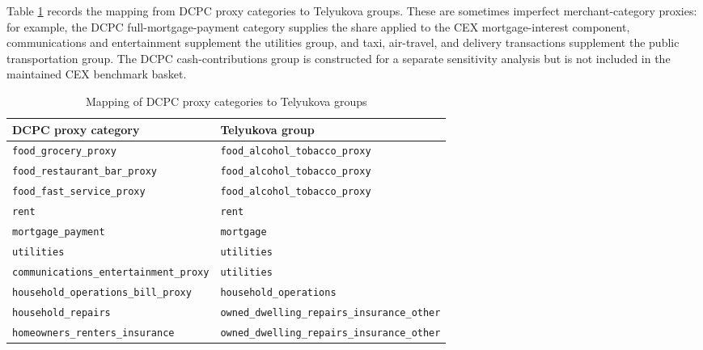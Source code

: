 \documentclass[11pt]{article}
\newcommand{\code}[1]{\nolinkurl{#1}}
\begin{document}
Table \ref{tab:dcpc-telyukova-crosswalk} records the mapping from DCPC proxy categories to Telyukova groups. These are sometimes imperfect merchant-category proxies: for example, the DCPC full-mortgage-payment category supplies the share applied to the CEX mortgage-interest component, communications and entertainment supplement the utilities group, and taxi, air-travel, and delivery transactions supplement the public transportation group. The DCPC cash-contributions group is constructed for a separate sensitivity analysis but is not included in the maintained CEX benchmark basket.

\begin{table}[htbp]
	\centering
	\small
	\setlength{\tabcolsep}{8pt}
	\renewcommand{\arraystretch}{1.2}
	
	\caption{Mapping of DCPC proxy categories to Telyukova groups}
	\label{tab:dcpc-telyukova-crosswalk}
	
	\begin{tabular}{
			>{\RaggedRight\arraybackslash}p{}
			>{\RaggedRight\arraybackslash}p{}
		}
		\toprule
		DCPC proxy category & Telyukova group \\
		\midrule
		
		\code{food_grocery_proxy}
		& \code{food_alcohol_tobacco_proxy} \\
		
		\code{food_restaurant_bar_proxy}
		& \code{food_alcohol_tobacco_proxy} \\
		
		\code{food_fast_service_proxy}
		& \code{food_alcohol_tobacco_proxy} \\
		
		\code{rent}
		& \code{rent} \\
		
		\code{mortgage_payment}
		& \code{mortgage} \\
		
		\code{utilities}
		& \code{utilities} \\
		
		\code{communications_entertainment_proxy}
		& \code{utilities} \\
		
		\code{household_operations_bill_proxy}
		& \code{household_operations} \\
		
		\code{household_repairs}
		& \code{owned_dwelling_repairs_insurance_other} \\
		
		\code{homeowners_renters_insurance}
		& \code{owned_dwelling_repairs_insurance_other} \\
		

\end{tabular}
\end{table}
\end{document}
